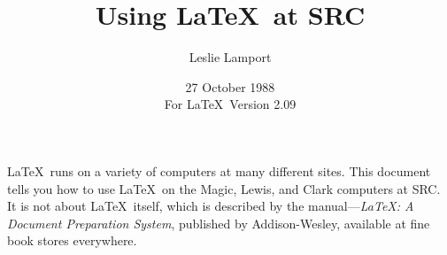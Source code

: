 %
%



\newcommand{\contact}{Leslie Lamport}

\newcommand{\BibTeX}{{\rm B\kern-.05em{\sc i\kern-.025em b}\kern-.08em
    T\kern-.1667em\lower.7ex\hbox{E}\kern-.125emX}}

\newcommand{\SLiTeX}{{\rm S\kern-.06em{\sc l\kern-.035emi}\kern-.06em T\kern
   -.1667em\lower.7ex\hbox{E}\kern-.125emX}}


\newcommand\bs{\char '134 }   %
\newcommand{\lb}{\char '173 } %
\newcommand{\rb}{\char '175 } %

\title{Using \LaTeX\ at SRC}

\author{Leslie Lamport}

\date{27 October 1988\\              %
For \LaTeX\ Version 2.09} 



\maketitle

\tableofcontents

\newpage

\LaTeX\ runs on a variety of computers at many different sites.  This
document tells you how to use \LaTeX\ on the Magic, Lewis, and Clark
computers at SRC. It is not about \LaTeX\ itself, which is described by
the manual---{\em \LaTeX: A Document Preparation System}, published by
Addison-Wesley, available at fine book stores everywhere.

